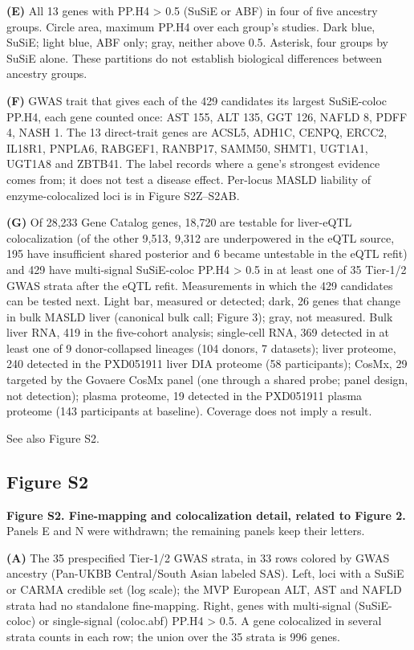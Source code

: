 \textbf{(E)} All 13 genes with PP.H4 \textgreater{} 0.5 (SuSiE or ABF) in four of five ancestry groups. Circle area, maximum PP.H4 over each group's studies. Dark blue, SuSiE; light blue, ABF only; gray, neither above 0.5. Asterisk, four groups by SuSiE alone. These partitions do not establish biological differences between ancestry groups.

\textbf{(F)} GWAS trait that gives each of the 429 candidates its largest SuSiE-coloc PP.H4, each gene counted once: AST 155, ALT 135, GGT 126, NAFLD 8, PDFF 4, NASH 1. The 13 direct-trait genes are ACSL5, ADH1C, CENPQ, ERCC2, IL18R1, PNPLA6, RABGEF1, RANBP17, SAMM50, SHMT1, UGT1A1, UGT1A8 and ZBTB41. The label records where a gene's strongest evidence comes from; it does not test a disease effect. Per-locus MASLD liability of enzyme-colocalized loci is in Figure S2Z--S2AB.

\textbf{(G)} Of 28,233 Gene Catalog genes, 18,720 are testable for liver-eQTL colocalization (of the other 9,513, 9,312 are underpowered in the eQTL source, 195 have insufficient shared posterior and 6 became untestable in the eQTL refit) and 429 have multi-signal SuSiE-coloc PP.H4 \textgreater{} 0.5 in at least one of 35 Tier-1/2 GWAS strata after the eQTL refit. Measurements in which the 429 candidates can be tested next. Light bar, measured or detected; dark, 26 genes that change in bulk MASLD liver (canonical bulk call; Figure 3); gray, not measured. Bulk liver RNA, 419 in the five-cohort analysis; single-cell RNA, 369 detected in at least one of 9 donor-collapsed lineages (104 donors, 7 datasets); liver proteome, 240 detected in the PXD051911 liver DIA proteome (58 participants); CosMx, 29 targeted by the Govaere CosMx panel (one through a shared probe; panel design, not detection); plasma proteome, 19 detected in the PXD051911 plasma proteome (143 participants at baseline). Coverage does not imply a result.

See also Figure S2.

\subsection{Figure S2}\label{figure-s2}

\textbf{Figure S2. Fine-mapping and colocalization detail, related to Figure 2.} Panels E and N were withdrawn; the remaining panels keep their letters.

\textbf{(A)} The 35 prespecified Tier-1/2 GWAS strata, in 33 rows colored by GWAS ancestry (Pan-UKBB Central/South Asian labeled SAS). Left, loci with a SuSiE or CARMA credible set (log scale); the MVP European ALT, AST and NAFLD strata had no standalone fine-mapping. Right, genes with multi-signal (SuSiE-coloc) or single-signal (coloc.abf) PP.H4 \textgreater{} 0.5. A gene colocalized in several strata counts in each row; the union over the 35 strata is 996 genes.

